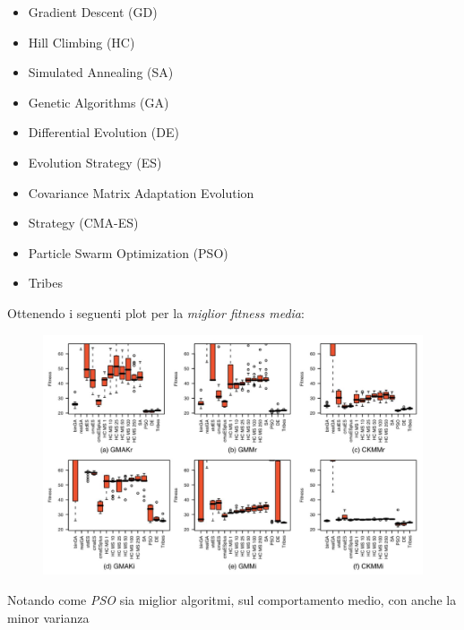 \documentclass[a4paper,12pt, oneside]{book}
\begin{document}
\begin{multicols}{2}
  \footnotesize
  \begin{itemize}
    \item Gradient Descent (GD) 
    \item Hill Climbing (HC)
    \item Simulated Annealing (SA)
    \item Genetic Algorithms (GA)
    \item Differential Evolution (DE)
    \item Evolution Strategy (ES)
    \item Covariance Matrix Adaptation Evolution
    \item Strategy (CMA-ES)
    \item Particle Swarm Optimization (PSO)
    \item Tribes
  \end{itemize}
\end{multicols}
Ottenendo i seguenti plot per la \textit{miglior fitness media}:
\begin{figure}[H]
  \centering
  \includegraphics[width = \textwidth]{img/me.jpg}
\end{figure}
Notando come \textit{PSO} sia miglior algoritmi, sul comportamento medio, con
anche la minor varianza
\end{document}
